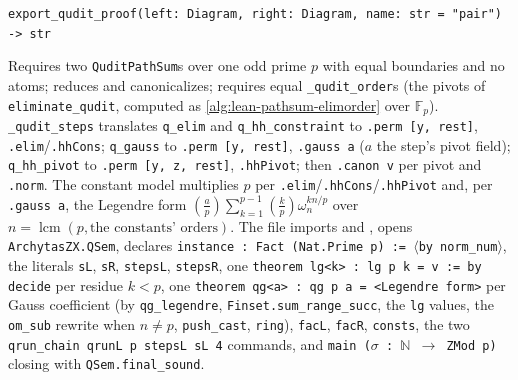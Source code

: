 \begin{signature}
\textnormal{\texttt{export\_\allowbreak{}qudit\_\allowbreak{}proof(\allowbreak{}left: Diagram,\allowbreak{} right: Diagram,\allowbreak{} name: str = "pair") -{}> str}}
\end{signature}
\noindent Requires two \textnormal{\texttt{QuditPathSum}}s over one odd prime $p$ with equal boundaries and no
atoms; reduces and canonicalizes; requires equal \textnormal{\texttt{\_\allowbreak{}qudit\_\allowbreak{}order}}s (the pivots of
\textnormal{\texttt{eliminate\_\allowbreak{}qudit}}, computed as \cref{alg:lean-pathsum-elimorder} over $\mathbb F_p$).
\textnormal{\texttt{\_\allowbreak{}qudit\_\allowbreak{}steps}} translates \textnormal{\texttt{q\_\allowbreak{}elim}} and \textnormal{\texttt{q\_\allowbreak{}hh\_\allowbreak{}constraint}} to
\textnormal{\texttt{.\allowbreak{}perm [y,\allowbreak{} rest]}}, \textnormal{\texttt{.\allowbreak{}elim}}/\textnormal{\texttt{.\allowbreak{}hhCons}}; \textnormal{\texttt{q\_\allowbreak{}gauss}} to \textnormal{\texttt{.\allowbreak{}perm [y,\allowbreak{} rest]}},
\textnormal{\texttt{.\allowbreak{}gauss a}} ($a$ the step's pivot field); \textnormal{\texttt{q\_\allowbreak{}hh\_\allowbreak{}pivot}} to \textnormal{\texttt{.\allowbreak{}perm [y,\allowbreak{} z,\allowbreak{} rest]}},
\textnormal{\texttt{.\allowbreak{}hhPivot}}; then \textnormal{\texttt{.\allowbreak{}canon v}} per pivot and \textnormal{\texttt{.\allowbreak{}norm}}. The constant model multiplies
$p$ per \textnormal{\texttt{.\allowbreak{}elim}}/\textnormal{\texttt{.\allowbreak{}hhCons}}/\textnormal{\texttt{.\allowbreak{}hhPivot}} and, per \textnormal{\texttt{.\allowbreak{}gauss a}}, the Legendre form
$\left(\frac ap\right)\sum_{k=1}^{p-1}\left(\frac kp\right)\omega_n^{kn/p}$ over
$n=\operatorname{lcm}(p,\text{the constants' orders})$. The file imports 
and , opens \textnormal{\texttt{ArchytasZX.\allowbreak{}QSem}}, declares
\textnormal{\texttt{instance : Fact (\allowbreak{}Nat.\allowbreak{}Prime p) := \ensuremath{\langle}by norm\_\allowbreak{}num\ensuremath{\rangle}}}, the literals \textnormal{\texttt{sL}}, \textnormal{\texttt{sR}}, \textnormal{\texttt{stepsL}},
\textnormal{\texttt{stepsR}}, one \textnormal{\texttt{theorem lg<k> : lg p k = v := by decide}} per residue $k<p$, one
\textnormal{\texttt{theorem qg<a> : qg p a = <Legendre form>}} per Gauss coefficient (by \textnormal{\texttt{qg\_\allowbreak{}legendre}},
\textnormal{\texttt{Finset.\allowbreak{}sum\_\allowbreak{}range\_\allowbreak{}succ}}, the \textnormal{\texttt{lg}} values, the \textnormal{\texttt{om\_\allowbreak{}sub}} rewrite when $n\ne p$,
\textnormal{\texttt{push\_\allowbreak{}cast}}, \textnormal{\texttt{ring}}), \textnormal{\texttt{facL}}, \textnormal{\texttt{facR}}, \textnormal{\texttt{consts}}, the two
\textnormal{\texttt{qrun\_\allowbreak{}chain qrunL p stepsL sL 4}} commands, and \textnormal{\texttt{main (\allowbreak{}\ensuremath{\sigma} : \ensuremath{\mathbb{N}} \ensuremath{\to} ZMod p)}} closing with
\textnormal{\texttt{QSem.\allowbreak{}final\_\allowbreak{}sound}}.

